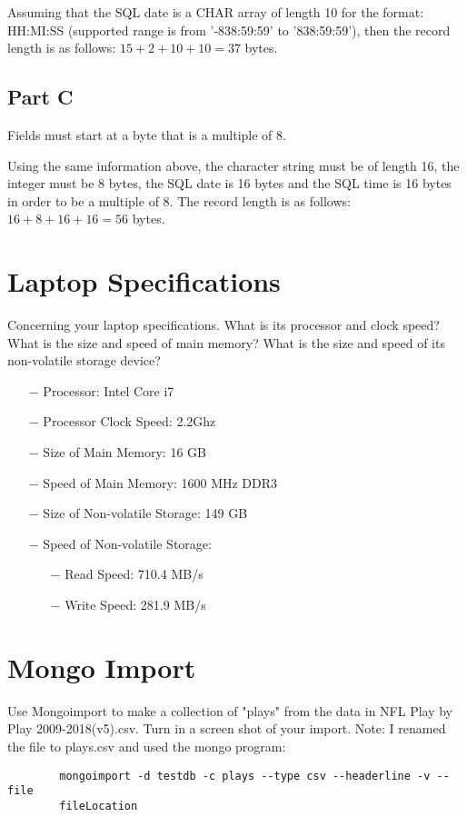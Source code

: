 \documentclass [a4paper,12pt] {article}
\begin{document}
        \vspace{.2in}

        Assuming that the SQL date is a CHAR array of length 10 for the format:
        HH:MI:SS (supported range is from  '-838:59:59' to '838:59:59'), then
        the record length is as follows: \(15 + 2 + 10 + 10 = 37 \) bytes.
    \subsection {Part C}
        Fields must start at a byte that is a multiple of 8.

        \vspace{.2in}

        Using the same information above, the character string must be of length
        16, the integer must be 8 bytes, the SQL date is 16 bytes and the SQL time
        is 16 bytes in order to be a multiple of 8. The record length is as follows:
        \(16 + 8 + 16 + 16 = 56\) bytes.

\section{Laptop Specifications}
    Concerning your laptop specifications. What is its processor and clock speed? 
    What is the size and speed of main memory? What is the size and speed of its 
    non-volatile storage device?

    \begin{itemize}
        \item[$-$]Processor: Intel Core i7
        \item[$-$]Processor Clock Speed: 2.2Ghz
        \item[$-$]Size of Main Memory: 16 GB
        \item[$-$]Speed of Main Memory: 1600 MHz DDR3
        \item[$-$]Size of Non-volatile Storage: 149 GB
        \item[$-$]Speed of Non-volatile Storage:
        \begin{itemize}
            \item[$-$]Read Speed: 710.4 MB/s
            \item[$-$]Write Speed: 281.9 MB/s
        \end{itemize}
    \end{itemize}

\section{Mongo Import}
    Use Mongoimport to make a collection of "plays" from the data in NFL Play by Play
    2009-2018(v5).csv. Turn in a screen shot of your import. Note: I renamed the file
    to plays.csv and used the mongo program:
    \begin{verbatim}
        mongoimport -d testdb -c plays --type csv --headerline -v --file 
        fileLocation
    \end{verbatim}
\end{document}
